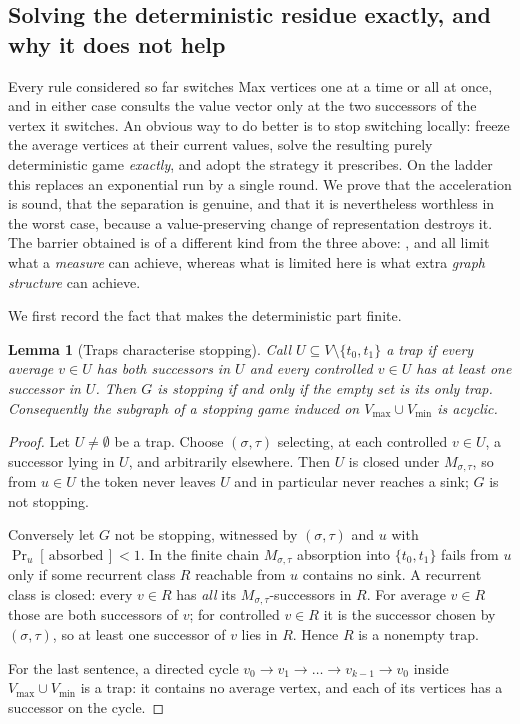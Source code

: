 \documentclass[11pt]{article}
\theoremstyle{plain}
\newtheorem{lemma}[theorem]{Lemma}
\theoremstyle{definition}
\newcommand{\Vmax}{V_{\max}}
\newcommand{\Vmin}{V_{\min}}
\begin{document}
\subsection{Solving the deterministic residue exactly, and why it does not
help}\label{sec:residue}

Every rule considered so far switches Max vertices one at a time or all at
once, and in either case consults the value vector only at the two
successors of the vertex it switches. An obvious way to do better is to
stop switching locally: freeze the average vertices at their current
values, solve the resulting purely deterministic game \emph{exactly}, and
adopt the strategy it prescribes. On the ladder this replaces an
exponential run by a single round. We prove that the acceleration is
sound, that the separation is genuine, and that it is nevertheless
worthless in the worst case, because a value-preserving change of
representation destroys it. The barrier obtained is of a different kind
from the three above: ,  and
 all limit what a \emph{measure} can achieve, whereas
what is limited here is what extra \emph{graph structure} can achieve.

We first record the fact that makes the deterministic part finite.

\begin{lemma}[Traps characterise stopping]\label{lem:trapchar}
Call $U\subseteq V\setminus\{t_0,t_1\}$ a \emph{trap} if every average
$v\in U$ has both successors in $U$ and every controlled $v\in U$ has at
least one successor in $U$. Then $G$ is stopping if and only if the empty
set is its only trap. Consequently the subgraph of a stopping game
induced on $\Vmax\cup\Vmin$ is acyclic.
\end{lemma}

\begin{proof}
Let $U\ne\emptyset$ be a trap. Choose $(\sigma,\tau)$ selecting, at each
controlled $v\in U$, a successor lying in $U$, and arbitrarily elsewhere.
Then $U$ is closed under $M_{\sigma,\tau}$, so from $u\in U$ the token
never leaves $U$ and in particular never reaches a sink; $G$ is not
stopping.

Conversely let $G$ not be stopping, witnessed by $(\sigma,\tau)$ and $u$
with $\Pr_u[\,\text{absorbed}\,]<1$. In the finite chain
$M_{\sigma,\tau}$ absorption into $\{t_0,t_1\}$ fails from $u$ only if
some recurrent class $R$ reachable from $u$ contains no sink. A recurrent
class is closed: every $v\in R$ has \emph{all} its $M_{\sigma,\tau}$-suc\-ces\-sors
in $R$. For average $v\in R$ those are both successors of $v$; for
controlled $v\in R$ it is the successor chosen by $(\sigma,\tau)$, so at
least one successor of $v$ lies in $R$. Hence $R$ is a nonempty trap.

For the last sentence, a directed cycle $v_0\to v_1\to\dots\to v_{k-1}\to
v_0$ inside $\Vmax\cup\Vmin$ is a trap: it contains no average vertex,
and each of its vertices has a successor on the cycle.
\end{proof}
\end{document}
